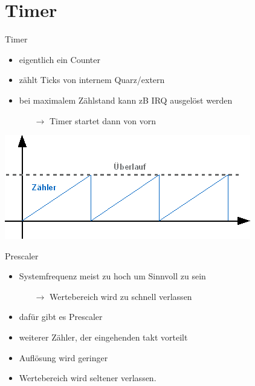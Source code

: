 \documentclass[aspectratio=169,presentation]{beamer}
\begin{document}
\section{Timer}
\begin{frame} {Timer}
  \begin{itemize}
    \item eigentlich ein Counter
    \item zählt Ticks von internem Quarz/extern
    \item bei maximalem Zählstand kann zB IRQ ausgelöst werden 
    \begin{itemize}
      \item[$\rightarrow$] Timer startet dann von vorn
    \end{itemize}
  \end{itemize}
\end{frame}

\begin{frame}
  \begin{center}
    \includegraphics[width=.7\textwidth]{kurve_timer}  
  \end{center}
\end{frame}


\begin{frame}{Prescaler}
  \begin{itemize}
    \item Systemfrequenz meist zu hoch um Sinnvoll zu sein
    \begin{itemize}
      \item[$\rightarrow$] Wertebereich wird zu schnell verlassen
    \end{itemize} 
    \item dafür gibt es Prescaler
    \item weiterer Zähler, der eingehenden takt \glqq{}vorteilt\grqq{}
    \item Auflösung wird geringer
    \item Wertebereich wird seltener verlassen.
  \end{itemize}
\end{frame}
\end{document}
